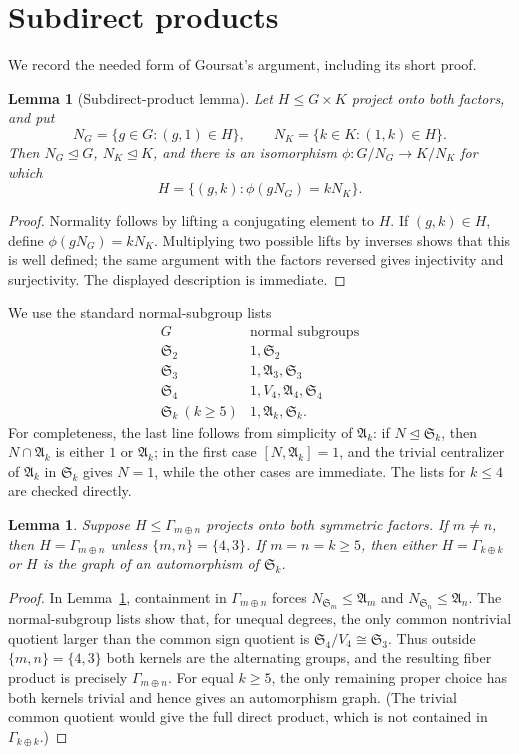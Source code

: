 \documentclass[11pt]{article}
\newtheorem{lemma}[theorem]{Lemma}
\newcommand{\Sym}{\mathfrak S}
\newcommand{\Alt}{\mathfrak A}
\begin{document}
\section{Subdirect products}
We record the needed form of Goursat's argument, including its short proof.
\begin{lemma}[Subdirect-product lemma]\label{lem:goursat}
Let $H\le G\times K$ project onto both factors, and put
\[
N_G=\{g\in G:(g,1)\in H\},\qquad N_K=\{k\in K:(1,k)\in H\}.
\]
Then $N_G\trianglelefteq G$, $N_K\trianglelefteq K$, and there is an isomorphism $\phi:G/N_G\to K/N_K$ for which
\[
H=\{(g,k):\phi(gN_G)=kN_K\}.
\]
\end{lemma}
\begin{proof}
Normality follows by lifting a conjugating element to $H$. If $(g,k)\in H$, define $\phi(gN_G)=kN_K$. Multiplying two possible lifts by inverses shows that this is well defined; the same argument with the factors reversed gives injectivity and surjectivity. The displayed description is immediate.
\end{proof}

We use the standard normal-subgroup lists
\[
\begin{array}{c|c}
G&\text{normal subgroups}\\ \hline
\Sym_2&1,\Sym_2\\
\Sym_3&1,\Alt_3,\Sym_3\\
\Sym_4&1,V_4,\Alt_4,\Sym_4\\
\Sym_k\ (k\ge5)&1,\Alt_k,\Sym_k.
\end{array}
\]
For completeness, the last line follows from simplicity of $\Alt_k$: if $N\trianglelefteq\Sym_k$, then $N\cap\Alt_k$ is either $1$ or $\Alt_k$; in the first case $[N,\Alt_k]=1$, and the trivial centralizer of $\Alt_k$ in $\Sym_k$ gives $N=1$, while the other cases are immediate. The lists for $k\le4$ are checked directly.

\begin{lemma}\label{lem:obstruction}
Suppose $H\le\Gamma_{m\oplus n}$ projects onto both symmetric factors. If $m\ne n$, then $H=\Gamma_{m\oplus n}$ unless $\{m,n\}=\{4,3\}$. If $m=n=k\ge5$, then either $H=\Gamma_{k\oplus k}$ or $H$ is the graph of an automorphism of $\Sym_k$.
\end{lemma}
\begin{proof}
In Lemma~\ref{lem:goursat}, containment in $\Gamma_{m\oplus n}$ forces $N_{\Sym_m}\le\Alt_m$ and $N_{\Sym_n}\le\Alt_n$. The normal-subgroup lists show that, for unequal degrees, the only common nontrivial quotient larger than the common sign quotient is $\Sym_4/V_4\cong\Sym_3$. Thus outside $\{m,n\}=\{4,3\}$ both kernels are the alternating groups, and the resulting fiber product is precisely $\Gamma_{m\oplus n}$. For equal $k\ge5$, the only remaining proper choice has both kernels trivial and hence gives an automorphism graph. (The trivial common quotient would give the full direct product, which is not contained in $\Gamma_{k\oplus k}$.)
\end{proof}
\end{document}
